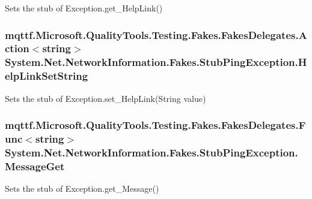 Sets the stub of Exception.\-get\-\_\-\-Help\-Link()

\hypertarget{class_system_1_1_net_1_1_network_information_1_1_fakes_1_1_stub_ping_exception_a00161e29b834d1cb4e42bcfd81914e3d}{
\subsubsection[{Help\-Link\-Set\-String}]{\setlength{\rightskip}{0pt plus 5cm}mqttf.\-Microsoft.\-Quality\-Tools.\-Testing.\-Fakes.\-Fakes\-Delegates.\-Action$<$string$>$ System.\-Net.\-Network\-Information.\-Fakes.\-Stub\-Ping\-Exception.\-Help\-Link\-Set\-String}}\label{class_system_1_1_net_1_1_network_information_1_1_fakes_1_1_stub_ping_exception_a00161e29b834d1cb4e42bcfd81914e3d}


Sets the stub of Exception.\-set\-\_\-\-Help\-Link(\-String value)

\hypertarget{class_system_1_1_net_1_1_network_information_1_1_fakes_1_1_stub_ping_exception_ad1e7c96772599203a9e11943f3a9f3f5}{
\subsubsection[{Message\-Get}]{\setlength{\rightskip}{0pt plus 5cm}mqttf.\-Microsoft.\-Quality\-Tools.\-Testing.\-Fakes.\-Fakes\-Delegates.\-Func$<$string$>$ System.\-Net.\-Network\-Information.\-Fakes.\-Stub\-Ping\-Exception.\-Message\-Get}}\label{class_system_1_1_net_1_1_network_information_1_1_fakes_1_1_stub_ping_exception_ad1e7c96772599203a9e11943f3a9f3f5}


Sets the stub of Exception.\-get\-\_\-\-Message()

